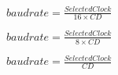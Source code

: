 \documentclass{article}
\begin{document}
$ baudrate = \frac{Selected Clock}{16 \times CD} $
\pagebreak

$ baudrate = \frac{Selected Clock}{8 \times CD} $
\pagebreak

$ baudrate = \frac{Selected Clock}{CD} $
\pagebreak
\end{document}
